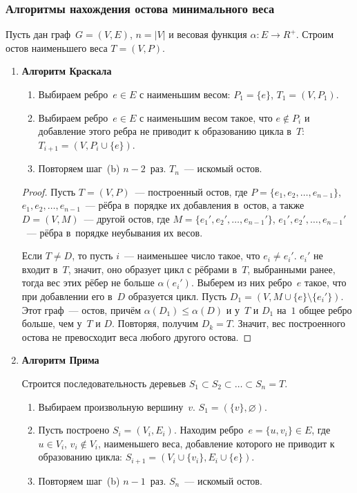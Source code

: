 \subsubsection{Алгоритмы нахождения остова минимального веса}
Пусть дан граф~$G = (V, E)$, $n = |V|$ и весовая функция $\alpha \colon E \to R^+$.
Строим остов наименьшего веса $T = (V, P)$.
\begin{enumerate}
	\item{}\textbf{Алгоритм Краскала}
	\begin{enumerate}
		\item Выбираем ребро~$e \in E$ с наименьшим весом: $P_1 = \{ e \}$, $T_1 = (V, P_1)$.
		\item Выбираем ребро~$e \in E$ с наименьшим весом такое, что $e \notin P_i$ и добавление этого ребра не приводит к образованию цикла в~$T$: $T_{i+1} = (V, P_i \cup \{ e \})$.
		\item Повторяем шаг~(b) $n - 2$~раз.
		$T_n$~--- искомый остов.
	\end{enumerate}
	\begin{proof}
		Пусть $T = (V, P)$~--- построенный остов, где
		$P = \{ e_1, e_2, \ldots, e_{n-1} \}$, $e_1, e_2, \ldots, \allowbreak e_{n-1}$~--- рёбра в~порядке их добавления в~остов, а также $D = (V, M)$~--- другой остов, где
		$M = \{ e_1', e_2', \ldots, \allowbreak e_{n-1}' \}$, $e_1', e_2', \ldots, \allowbreak e_{n-1}'$~--- рёбра в~порядке неубывания их весов.
		
		Если $T \neq D$, то пусть $i$~--- наименьшее число такое, что $e_i \neq e_i'$.
		$e_i'$ не входит в~$T$, значит, оно образует цикл с рёбрами в~$T$, выбранными ранее, тогда вес этих рёбер не больше $\alpha(e_i')$.
		Выберем из них ребро~$e$ такое, что при добавлении его в~$D$ образуется цикл.
		Пусть $D_1 = (V, M \cup \{ e \} \setminus \{ e_i' \})$.
		Этот граф~--- остов, причём $\alpha(D_1) \leqslant \alpha(D)$ и у~$T$ и $D_1$ на~$1$ общее ребро больше, чем у~$T$ и $D$.
		Повторяя, получим $D_k = T$.
		Значит, вес построенного остова не превосходит веса любого другого остова.
	\end{proof}

	\item{}\textbf{Алгоритм Прима}
	
	Строится последовательность деревьев $S_1 \subset S_2 \subset \ldots \subset S_n = T$.
	\begin{enumerate}
		\item Выбираем произвольную вершину~$v$.
		$S_1 = (\{ v \}, \varnothing)$.
		\item Пусть построено $S_i = (V_i, E_i)$.
		Находим ребро~$e = \{ u, v_i \} \in E$, где $u \in V_i$, $v_i \notin V_i$, наименьшего веса, добавление которого не приводит к образованию цикла: $S_{i+1} = (V_i \cup \{ v_i \}, E_i \cup \{ e \})$.
		\item Повторяем шаг~(b) $n - 1$~раз.
		$S_n$~--- искомый остов.
	\end{enumerate}
\end{enumerate}
